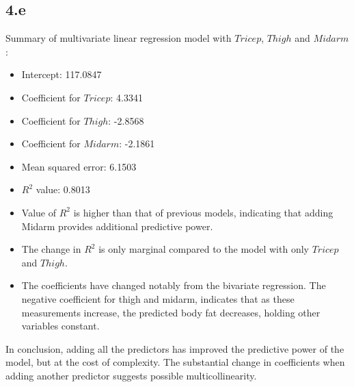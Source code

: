 \documentclass[12pt]{article}
\begin{document}
\subsection*{4.e}
Summary of multivariate linear regression model with \(Tricep\), \(Thigh\) and
\(Midarm\):
\begin{itemize}
    \item Intercept: 117.0847
    \item Coefficient for \(Tricep\): 4.3341
    \item Coefficient for \(Thigh\): -2.8568
    \item Coefficient for \(Midarm\): -2.1861
    \item Mean squared error: 6.1503
    \item \(R^2\) value: 0.8013
    \item Value of \(R^2\) is higher than that of previous models, indicating
    that adding Midarm provides additional predictive power.
    \item The change in \(R^2\) is only marginal compared to the model with
    only \(Tricep\) and \(Thigh\).
    \item The coefficients have changed notably from the bivariate regression.
    The negative coefficient for thigh and midarm, indicates that as these
    measurements increase, the predicted body fat decreases,
    holding other variables constant.
\end{itemize}
In conclusion, adding all the predictors has improved the predictive power of
the model, but at the cost of complexity. The substantial change in coefficients
when adding another predictor suggests possible multicollinearity.
\end{document}
